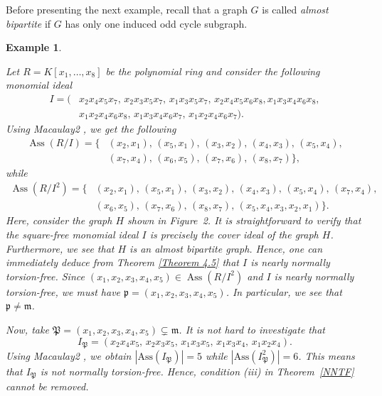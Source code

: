 \documentclass[11pt]{amsart}
\newtheorem{example}[theorem]{Example}
\begin{document}

 Before presenting the next example,  recall that a graph $G$ is called  \textit{almost bipartite} if  $G$ has only one induced odd cycle subgraph. 
 
 \begin{example}
\em{
Let $R=K[x_1, \ldots, x_8]$ be the polynomial ring and consider the following monomial ideal
\begin{align*}
I = (&x_2x_4x_5x_7,\,x_2x_3x_5x_7,\,x_1x_3x_5x_7,\,x_2x_4x_5x_6x_8, x_1x_3x_4x_6x_8,\\
& x_1x_2x_4x_6x_8,\,x_1x_3x_4x_6x_7,\,x_1x_2x_4x_6x_7). 
\end{align*}
 Using Macaulay2 \cite{GS}, we get the following 
\begin{align*}
\operatorname{Ass}(R/I)=\{&
(x_2,x_1),\,(x_5,x_1),\,(x_3,x_2),\,(x_4,x_3),\,(x_5,x_4),\\
&(x_7,x_4),\,(x_6,x_5),\,(x_7,x_6),\,(x_8,x_7)\},
\end{align*}
while
\begin{align*}
\operatorname{Ass}(R/I^2)=\{&(x_2,x_1),\,(x_5,x_1),\,(x_3,x_2),\,(x_4,x_3),\,(x_5,x_4),\,(x_7,x_4),\\
&(x_6,x_5),\,(x_7,x_6),\,(x_8,x_7),\,(x_5,x_4,x_3,x_2,x_1)\}.
\end{align*}
Here, consider the graph $H$ shown in Figure~2. It is straightforward to verify that the square-free monomial ideal $I$ is 
precisely the cover ideal of the graph $H$. Furthermore, we see that $H$ is an almost bipartite graph. Hence, 
one can immediately deduce from Theorem  \ref{Theorem 4.5}  that $I$ is nearly normally torsion-free.
 Since $(x_1,x_2,x_3,x_4,x_5)\in \operatorname{Ass}(R/I^2)$ and $I$ is nearly normally torsion-free, we must have 
 $\mathfrak{p}=(x_1,x_2,x_3,x_4,x_5)$. In particular, we see that $\mathfrak{p}\neq \mathfrak{m}$. 
 
 Now, take $\mathfrak{P}=(x_1,x_2,x_3,x_4,x_5)\subsetneq \mathfrak{m}$. It is not hard to investigate that 
$$I_{\mathfrak{P}}= (x_2x_4x_5,\,x_2x_3x_5,\,x_1x_3x_5,\,x_1x_3x_4,\,x_1x_2x_4).$$
  Using Macaulay2 \cite{GS}, we obtain  $|\mathrm{Ass}(I_{\mathfrak{P}})|=5$ while $|\mathrm{Ass}(I_{\mathfrak{P}}^2)|=6$. This means 
 that  $I_{\mathfrak{P}}$ is not normally torsion-free.   
Hence, condition (iii) in Theorem~\ref{NNTF} cannot be removed.

}
 \end{example}
\end{document}
